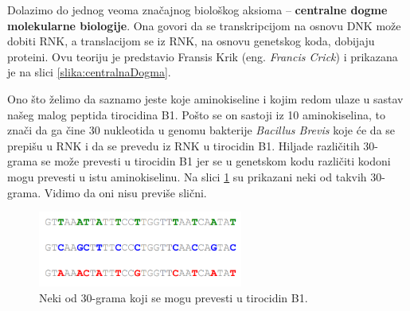 Dolazimo do jednog veoma značajnog biološkog aksioma -- \textbf{centralne dogme molekularne biologije}. Ona govori da se transkripcijom na osnovu DNK može dobiti RNK, a translacijom se iz RNK, na osnovu genetskog koda, dobijaju proteini. Ovu teoriju je predstavio Fransis Krik (eng. \textit{Francis Crick}) i prikazana je na slici \ref{slika:centralnaDogma}.

Ono što želimo da saznamo jeste koje aminokiseline i kojim redom ulaze u sastav našeg malog peptida tirocidina B1. Pošto se on sastoji iz 10 aminokiselina, to znači da ga čine 30 nukleotida u genomu bakterije \textit{Bacillus Brevis} koje će da se prepišu u RNK i da se prevedu iz RNK u tirocidin B1. Hiljade različitih $30$-grama se može prevesti u tirocidin B1 jer se u genetskom kodu različiti kodoni mogu prevesti u istu aminokiselinu. Na slici \ref{slika:30grami} su prikazani neki od takvih $30$-grama. Vidimo da oni nisu previše slični. \\
\begin{figure}[h!]
	\centering
	\includegraphics[width=0.6\textwidth]{poglavlja/4/slike/30grami.png}
	\caption{Neki od $30$-grama koji se mogu prevesti u tirocidin B1.}
	\label{slika:30grami}
\end{figure} 

